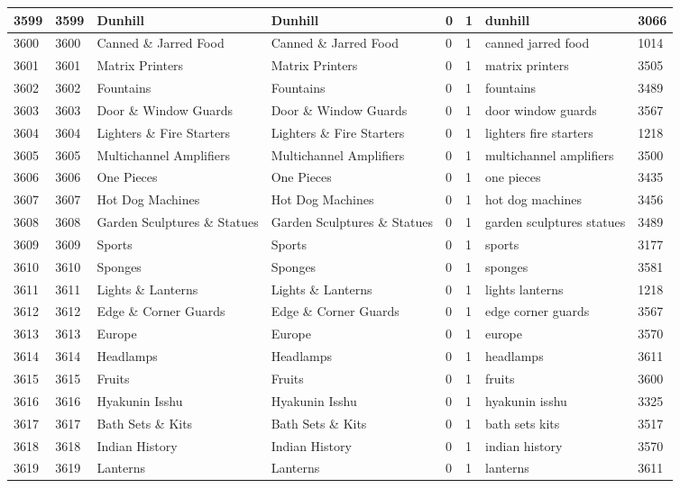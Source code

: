 \begin{longtable}{|l|l|l|l|l|l|l|l|}
3599 & 3599 & Dunhill & Dunhill & 0 & 1 & dunhill & 3066 \\ \hline 
3600 & 3600 & Canned \& Jarred Food & Canned \& Jarred Food & 0 & 1 & canned jarred food & 1014 \\ \hline 
3601 & 3601 & Matrix Printers & Matrix Printers & 0 & 1 & matrix printers & 3505 \\ \hline 
3602 & 3602 & Fountains & Fountains & 0 & 1 & fountains & 3489 \\ \hline 
3603 & 3603 & Door \& Window Guards & Door \& Window Guards & 0 & 1 & door window guards & 3567 \\ \hline 
3604 & 3604 & Lighters \& Fire Starters & Lighters \& Fire Starters & 0 & 1 & lighters fire starters & 1218 \\ \hline 
3605 & 3605 & Multichannel Amplifiers & Multichannel Amplifiers & 0 & 1 & multichannel amplifiers & 3500 \\ \hline 
3606 & 3606 & One Pieces & One Pieces & 0 & 1 & one pieces & 3435 \\ \hline 
3607 & 3607 & Hot Dog Machines & Hot Dog Machines & 0 & 1 & hot dog machines & 3456 \\ \hline 
3608 & 3608 & Garden Sculptures \& Statues & Garden Sculptures \& Statues & 0 & 1 & garden sculptures statues & 3489 \\ \hline 
3609 & 3609 & Sports & Sports & 0 & 1 & sports & 3177 \\ \hline 
3610 & 3610 & Sponges & Sponges & 0 & 1 & sponges & 3581 \\ \hline 
3611 & 3611 & Lights \& Lanterns & Lights \& Lanterns & 0 & 1 & lights lanterns & 1218 \\ \hline 
3612 & 3612 & Edge \& Corner Guards & Edge \& Corner Guards & 0 & 1 & edge corner guards & 3567 \\ \hline 
3613 & 3613 & Europe & Europe & 0 & 1 & europe & 3570 \\ \hline 
3614 & 3614 & Headlamps & Headlamps & 0 & 1 & headlamps & 3611 \\ \hline 
3615 & 3615 & Fruits & Fruits & 0 & 1 & fruits & 3600 \\ \hline 
3616 & 3616 & Hyakunin Isshu & Hyakunin Isshu & 0 & 1 & hyakunin isshu & 3325 \\ \hline 
3617 & 3617 & Bath Sets \& Kits & Bath Sets \& Kits & 0 & 1 & bath sets kits & 3517 \\ \hline 
3618 & 3618 & Indian History & Indian History & 0 & 1 & indian history & 3570 \\ \hline 
3619 & 3619 & Lanterns & Lanterns & 0 & 1 & lanterns & 3611 \\ \hline 

\end{longtable}
